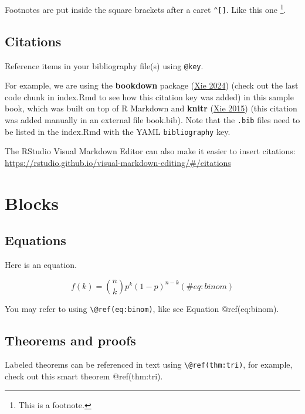 \documentclass[
]{book}
\begin{document}
Footnotes are put inside the square brackets after a caret
\texttt{\^{}{[}{]}}. Like this one \footnote{This is a footnote.}.

\hypertarget{citations}{%
\section{Citations}\label{citations}}

Reference items in your bibliography file(s) using \texttt{@key}.

For example, we are using the \textbf{bookdown} package
(\protect\hyperlink{ref-R-bookdown}{Xie 2024}) (check out the last code
chunk in index.Rmd to see how this citation key was added) in this
sample book, which was built on top of R Markdown and \textbf{knitr}
(\protect\hyperlink{ref-xie2015}{Xie 2015}) (this citation was added
manually in an external file book.bib). Note that the \texttt{.bib}
files need to be listed in the index.Rmd with the YAML
\texttt{bibliography} key.

The RStudio Visual Markdown Editor can also make it easier to insert
citations:
\url{https://rstudio.github.io/visual-markdown-editing/\#/citations}

\hypertarget{blocks}{%
\chapter{Blocks}\label{blocks}}

\hypertarget{equations}{%
\section{Equations}\label{equations}}

Here is an equation.

\begin{equation} 
  f\left(k\right) = \binom{n}{k} p^k\left(1-p\right)^{n-k}
  (\#eq:binom)
\end{equation}

You may refer to using \texttt{\textbackslash{}@ref(eq:binom)}, like see
Equation @ref(eq:binom).

\hypertarget{theorems-and-proofs}{%
\section{Theorems and proofs}\label{theorems-and-proofs}}

Labeled theorems can be referenced in text using
\texttt{\textbackslash{}@ref(thm:tri)}, for example, check out this
smart theorem @ref(thm:tri).
\end{document}
